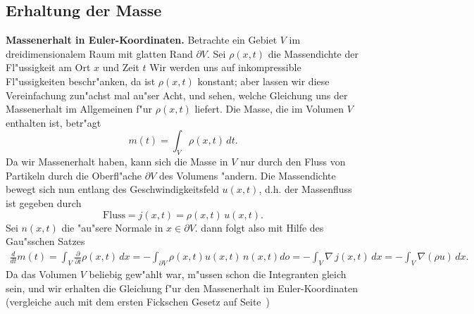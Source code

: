 \subsection{Erhaltung der Masse} 
{\bf Massenerhalt in Euler-Koordinaten.} Betrachte ein Gebiet $V$ im 
dreidimensionalem Raum mit glatten Rand $\partial V$. 
Sei  $\rho(x,t)$ die Massendichte der Fl"ussigkeit am Ort $x$ und Zeit $t$
Wir werden uns auf inkompressible Fl"ussigkeiten beschr"anken, da ist $\rho(x,t)$ 
konstant; aber lassen wir diese Vereinfachung zun"achst mal au"ser Acht, und sehen, 
welche Gleichung uns der Massenerhalt im Allgemeinen f"ur $\rho(x,t)$ liefert.  
Die Masse, die im Volumen $V$ enthalten ist, betr"agt
$$ m(t) = \int_V \rho(x,t)\, dt.$$
Da wir Massenerhalt haben, kann sich die Masse in $V$ nur durch den Fluss von
Partikeln durch die Oberfl"ache  $\partial V$ des Volumens "andern. 
Die Massendichte bewegt sich nun entlang des Geschwindigkeitsfeld $u(x,t)$, 
d.h. der Massenfluss ist gegeben durch 
$$ \mbox{Fluss} = j(x,t) = \rho(x,t)\,u(x,t). $$
Sei $n(x,t)$ die "au"sere Normale in $x\in\partial V$. dann folgt also 
mit Hilfe des Gau"sschen Satzes
\begin{eqnarray*}
\frac{d}{dt} m(t) = \int_V\frac{\partial}{\partial t}\rho(x,t)\, dx = - \int_{\partial V} \rho(x,t) u(x,t)\,n(x,t) do 
= -\int_V\nabla\,j(x,t)\, dx
= -\int_V\nabla(\rho u)\, dx.
\end{eqnarray*}
Da das Volumen $V$ beliebig gew"ahlt war, m"ussen schon die Integranten gleich sein, 
und wir erhalten die Gleichung f"ur den Massenerhalt im Euler-Koordinaten (vergleiche auch mit dem ersten Fickschen Gesetz
 auf Seite~\pageref{fickschesXXGesetz})\\


